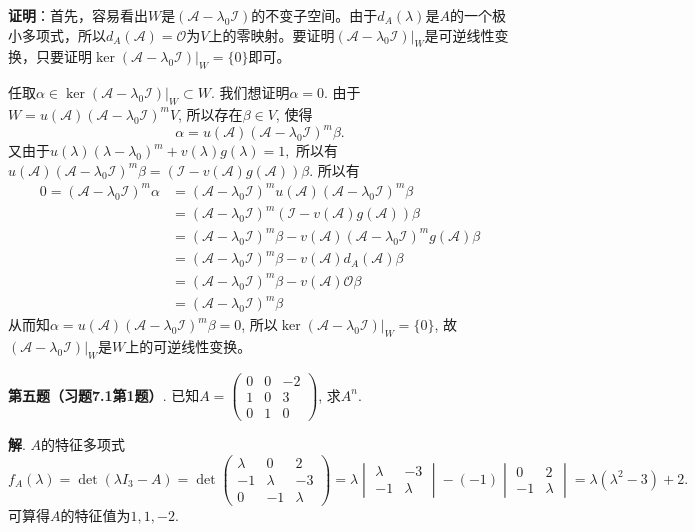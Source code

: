 {\bf 证明}：首先，容易看出$W$是$(\mathscr{A} - \lambda_0\mathscr{I})$的不变子空间。由于$d_A(\lambda)$是$A$的一个极小多项式，所以$d_A(\mathscr{A}) = \mathscr{O}$为$V$上的零映射。要证明$(\mathscr{A} - \lambda_0\mathscr{I})|_W$是可逆线性变换，只要证明$\ker (\mathscr{A} - \lambda_0\mathscr{I})|_W = \{0\}$即可。

任取$\alpha \in \ker (\mathscr{A} - \lambda_0\mathscr{I})|_W \subset W$. 我们想证明$\alpha = 0$. 由于$W = u(\mathscr{A})(\mathscr{A} - \lambda_0\mathscr{I})^m V$, 所以存在$\beta \in V$, 使得
$$\alpha = u(\mathscr{A})(\mathscr{A} - \lambda_0\mathscr{I})^m \beta.$$
又由于$u(\lambda)(\lambda-\lambda_0)^m + v(\lambda)g(\lambda) = 1,$ 所以有$u(\mathscr{A})(\mathscr{A} - \lambda_0\mathscr{I})^m \beta = (\mathscr{I} - v(\mathscr{A})g(\mathscr{A})) \beta$. 所以有
\begin{align*}
0 = (\mathscr{A} - \lambda_0\mathscr{I})^m \alpha & = (\mathscr{A} - \lambda_0\mathscr{I})^m u(\mathscr{A})(\mathscr{A} - \lambda_0\mathscr{I})^m \beta \\
& = (\mathscr{A} - \lambda_0\mathscr{I})^m (\mathscr{I} - v(\mathscr{A})g(\mathscr{A})) \beta \\
& = (\mathscr{A} - \lambda_0\mathscr{I})^m \beta - v(\mathscr{A}) (\mathscr{A} - \lambda_0\mathscr{I})^m g(\mathscr{A}) \beta \\
& = (\mathscr{A} - \lambda_0\mathscr{I})^m \beta - v(\mathscr{A}) d_A(\mathscr{A}) \beta \\
& = (\mathscr{A} - \lambda_0\mathscr{I})^m \beta - v(\mathscr{A}) \mathscr{O} \beta \\
& = (\mathscr{A} - \lambda_0\mathscr{I})^m \beta
\end{align*}
从而知$\alpha = u(\mathscr{A})(\mathscr{A} - \lambda_0\mathscr{I})^m \beta = 0$, 所以$\ker (\mathscr{A} - \lambda_0\mathscr{I})|_W = \{0\}$, 故$(\mathscr{A} - \lambda_0\mathscr{I})|_W$是$W$上的可逆线性变换。


\newpageorvspace


{\bf 第五题（习题7.1第1题）}. 已知$A = \begin{pmatrix} 0 & 0 & -2 \\ 1 & 0 & 3 \\ 0 & 1 & 0 \end{pmatrix}$, 求$A^n$.

{\bf 解}. $A$的特征多项式
$$f_A(\lambda) = \det (\lambda I_3 - A) = \det \begin{pmatrix} \lambda & 0 & 2 \\ -1 & \lambda & -3 \\ 0 & -1 & \lambda \end{pmatrix} = \lambda \begin{vmatrix} \lambda & -3 \\ -1 & \lambda \end{vmatrix} - (-1) \begin{vmatrix} 0 & 2 \\ -1 & \lambda \end{vmatrix} = \lambda(\lambda^2-3) + 2.$$
可算得$A$的特征值为$1, 1, -2$.

